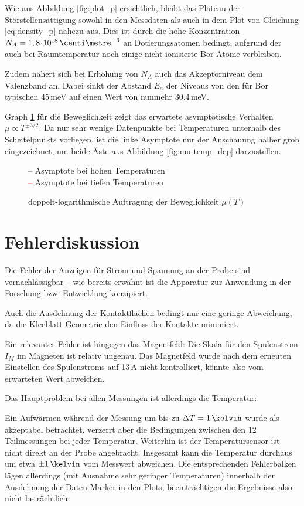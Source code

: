 Wie aus Abbildung \ref{fig:plot_p} ersichtlich, bleibt das Plateau der Störstellensättigung sowohl in den Messdaten als auch in dem Plot von Gleichung \eqref{eq:density_p} nahezu aus. Dies ist durch die hohe Konzentration $N_A = 1,8\cdt 10^{18}\,\centi\metre^{-3}$ an Dotierungsatomen bedingt, aufgrund der auch bei Raumtemperatur noch einige nicht-ionisierte Bor-Atome verbleiben.

Zudem nähert sich bei Erhöhung von $N_A$ auch das Akzeptorniveau dem Valenzband an. Dabei sinkt der Abstand $E_a$ der Niveaus von den für Bor typischen 45\,meV auf einen Wert von nunmehr 30,4\,meV.

Graph \ref{fig:plot_mu} für die Beweglichkeit zeigt das erwartete asymptotische Verhalten $\mu \propto T^{\pm 3/2}$. Da nur sehr wenige Datenpunkte bei Temperaturen unterhalb des Scheitelpunkts vorliegen, ist die linke Asymptote nur der Anschauung halber grob eingezeichnet, um beide Äste aus Abbildung \ref{fig:mu-temp_dep} darzustellen.
\begin{figure}[p]
\centering
\begin{sideways}

\end{sideways}
\caption{doppelt-logarithmische Auftragung der Beweglichkeit $\mu(T)$}
\label{fig:plot_mu}
\textcolor{black}{--} Asymptote bei hohen Temperaturen\\
\textcolor{red}{--} Asymptote bei tiefen Temperaturen
\end{figure}

\newpage
\section{Fehlerdiskussion}
Die Fehler der Anzeigen für Strom und Spannung an der Probe sind vernachlässigbar -- wie bereits erwähnt ist die Apparatur zur Anwendung in der Forschung bzw. Entwicklung konzipiert.

Auch die Ausdehnung der Kontaktflächen bedingt nur eine geringe Abweichung, da die Kleeblatt-Geometrie den Einfluss der Kontakte minimiert.

Ein relevanter Fehler ist hingegen das Magnetfeld: Die Skala für den Spulenstrom $I_M$ im Magneten ist relativ ungenau. Das Magnetfeld wurde nach dem erneuten Einstellen des Spulenstroms auf 13\,A nicht kontrolliert, könnte also vom erwarteten Wert abweichen.

Das Hauptproblem bei allen Messungen ist allerdings die Temperatur:

Ein Aufwärmen während der Messung um bis zu $\Delta T = 1\,\kelvin$ wurde als akzeptabel betrachtet, verzerrt aber die Bedingungen zwischen den 12 Teilmessungen bei jeder Temperatur. Weiterhin ist der Temperatursensor ist nicht direkt an der Probe angebracht. %
Insgesamt kann die Temperatur durchaus um etwa $\pm 1\,\kelvin$ vom Messwert abweichen. Die entsprechenden Fehlerbalken lägen allerdings (mit Ausnahme sehr geringer Temperaturen) innerhalb der Ausdehnung der Daten-Marker in den Plots, beeinträchtigen die Ergebnisse also nicht beträchtlich.
